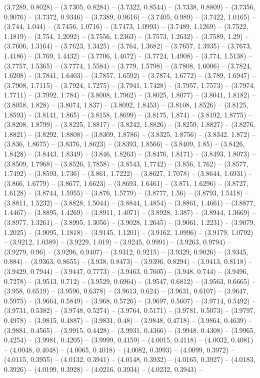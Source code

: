 (3.7289, 0.8028) -- (3.7305, 0.8284) -- (3.7322, 0.8544) -- (3.7338, 0.8809) -- (3.7356, 0.9076) -- (3.7372, 0.9346) -- (3.7389, 0.9616) -- (3.7405, 0.989) -- (3.7422, 1.0165) -- (3.744, 1.044) -- (3.7456, 1.0716) -- (3.7473, 1.0993) -- (3.7489, 1.1269) -- (3.7522, 1.1819) -- (3.754, 1.2092) -- (3.7556, 1.2363) -- (3.7573, 1.2632) -- (3.7589, 1.29) -- (3.7606, 1.3164) -- (3.7623, 1.3425) -- (3.764, 1.3682) -- (3.7657, 1.3935) -- (3.7673, 1.4186) -- (3.769, 1.4432) -- (3.7706, 1.4672) -- (3.7724, 1.4908) -- (3.774, 1.5138) -- (3.7757, 1.5365) -- (3.7774, 1.5584) -- (3.779, 1.5798) -- (3.7808, 1.6006) -- (3.7824, 1.6208) -- (3.7841, 1.6403) -- (3.7857, 1.6592) -- (3.7874, 1.6772) -- (3.789, 1.6947) -- (3.7908, 1.7115) -- (3.7924, 1.7275) -- (3.7941, 1.7428) -- (3.7957, 1.7573) -- (3.7974, 1.7711) -- (3.7992, 1.784) -- (3.8008, 1.7962) -- (3.8025, 1.8077) -- (3.8041, 1.8182) -- (3.8058, 1.828) -- (3.8074, 1.837) -- (3.8092, 1.8453) -- (3.8108, 1.8526) -- (3.8125, 1.8593) -- (3.8141, 1.865) -- (3.8158, 1.8699) -- (3.8175, 1.874) -- (3.8192, 1.8775) -- (3.8208, 1.8799) -- (3.8225, 1.8817) -- (3.8242, 1.8826) -- (3.8259, 1.8827) -- (3.8276, 1.8821) -- (3.8292, 1.8808) -- (3.8309, 1.8786) -- (3.8325, 1.8756) -- (3.8342, 1.872) -- (3.836, 1.8675) -- (3.8376, 1.8623) -- (3.8393, 1.8566) -- (3.8409, 1.85) -- (3.8426, 1.8428) -- (3.8443, 1.8349) -- (3.846, 1.8263) -- (3.8476, 1.8171) -- (3.8493, 1.8073) -- (3.8509, 1.7968) -- (3.8526, 1.7858) -- (3.8543, 1.7742) -- (3.856, 1.762) -- (3.8577, 1.7492) -- (3.8593, 1.736) -- (3.861, 1.7222) -- (3.8627, 1.7078) -- (3.8644, 1.6931) -- (3.866, 1.6779) -- (3.8677, 1.6623) -- (3.8693, 1.6461) -- (3.871, 1.6296) -- (3.8727, 1.6128) -- (3.8744, 1.5955) -- (3.876, 1.5779) -- (3.8777, 1.56) -- (3.8793, 1.5418) -- (3.8811, 1.5232) -- (3.8828, 1.5044) -- (3.8844, 1.4854) -- (3.8861, 1.4661) -- (3.8877, 1.4467) -- (3.8895, 1.4269) -- (3.8911, 1.4071) -- (3.8928, 1.387) -- (3.8944, 1.3669) -- (3.8977, 1.3261) -- (3.8995, 1.3056) -- (3.9028, 1.2645) -- (3.9061, 1.2231) -- (3.9079, 1.2025) -- (3.9095, 1.1818) -- (3.9145, 1.1201) -- (3.9162, 1.0996) -- (3.9179, 1.0792) -- (3.9212, 1.0389) -- (3.9229, 1.019) -- (3.9245, 0.9991) -- (3.9263, 0.9794) -- (3.9279, 0.96) -- (3.9296, 0.9407) -- (3.9312, 0.9215) -- (3.9329, 0.9026) -- (3.9345, 0.884) -- (3.9363, 0.8655) -- (3.938, 0.8473) -- (3.9396, 0.8294) -- (3.9413, 0.8118) -- (3.9429, 0.7944) -- (3.9447, 0.7773) -- (3.9463, 0.7605) -- (3.948, 0.744) -- (3.9496, 0.7278) -- (3.9513, 0.712) -- (3.9529, 0.6964) -- (3.9547, 0.6812) -- (3.9563, 0.6665) -- (3.958, 0.6519) -- (3.9596, 0.6378) -- (3.9613, 0.624) -- (3.9631, 0.6107) -- (3.9647, 0.5975) -- (3.9664, 0.5849) -- (3.968, 0.5726) -- (3.9697, 0.5607) -- (3.9714, 0.5492) -- (3.9731, 0.5382) -- (3.9748, 0.5274) -- (3.9764, 0.5171) -- (3.9781, 0.5073) -- (3.9797, 0.4978) -- (3.9815, 0.4887) -- (3.9831, 0.48) -- (3.9848, 0.4718) -- (3.9864, 0.4639) -- (3.9881, 0.4565) -- (3.9915, 0.4428) -- (3.9931, 0.4366) -- (3.9948, 0.4308) -- (3.9965, 0.4254) -- (3.9981, 0.4205) -- (3.9999, 0.4159) -- (4.0015, 0.4118) -- (4.0032, 0.4081) -- (4.0048, 0.4048) -- (4.0065, 0.4018) -- (4.0082, 0.3993) -- (4.0099, 0.3972) -- (4.0115, 0.3955) -- (4.0132, 0.3941) -- (4.0148, 0.3932) -- (4.0165, 0.3927) -- (4.0183, 0.3926) -- (4.0199, 0.3928) -- (4.0216, 0.3934) -- (4.0232, 0.3943) -- 
